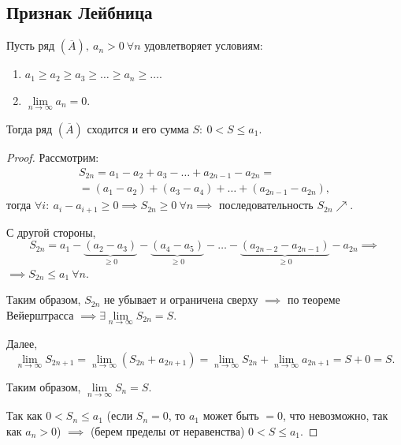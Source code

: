 \setcounter{subsection}{51}

\subsection{Признак Лейбница}

\begin{theorem}
    Пусть ряд $(\overline{A}), \ a_n > 0 \ \forall n$ удовлетворяет условиям:
    \begin{enumerate}
        \item $a_1 \geqslant a_2 \geqslant a_3 \geqslant \ldots \geqslant a_n \geqslant \ldots$.
        \item $\underset{n\rightarrow\infty}{\lim} a_n = 0$.
    \end{enumerate}

    Тогда ряд $(\overline{A})$ сходится и его сумма $S: \ 0 < S \leqslant a_1$.
\end{theorem}

\begin{proof}
    Рассмотрим:
    \begin{multline*}
        S_{2n} = a_1 - a_2 + a_3 - \ldots + a_{2n - 1} - a_{2n} = \\
        = (a_1 - a_2) + (a_3 - a_4) + \ldots + (a_{2n-1} - a_{2n}),
    \end{multline*}
    тогда $\forall i: \ a_i - a_{i+1} \geqslant 0 \implies S_{2n}\geqslant 0 \ \forall n \implies$ последовательность $S_{2n} \nearrow$.

    С другой стороны,
    \[
        S_{2n} = a_1 - \underbrace{(a_2 - a_3)}_{\geqslant 0} - \underbrace{(a_4 - a_5)}_{\geqslant 0} - \ldots - \underbrace{(a_{2n-2} - a_{2n-1})}_{\geqslant0} - a_{2n} \implies
    \]
    $\implies S_{2n} \leqslant a_1 \ \forall n$.

    Таким образом, $S_{2n}$ не убывает и ограничена сверху $\implies$ по теореме Вейерштрасса $\implies \exists \underset{n\rightarrow\infty}{\lim} S_{2n} = S$.

    Далее,
    \[
        \underset{n\rightarrow\infty}{\lim}S_{2n+1} = \underset{n\rightarrow\infty}{\lim}(S_{2n} + a_{2n+1}) = \underset{n\rightarrow\infty}{\lim}S_{2n} + \underset{n\rightarrow\infty}{\lim} a_{2n+1} = S + 0 = S.
    \]

    Таким образом, $\underset{n\rightarrow\infty}{\lim}S_n = S$.

    Так как $0 < S_n \leqslant a_1$ (если $S_n = 0$, то $a_1$ может быть $=0$, что невозможно, так как $a_n > 0$) $\implies$ (берем пределы от неравенства) $0 < S \leqslant a_1$.
\end{proof}

